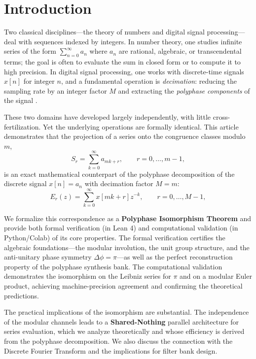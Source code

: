 \documentclass{article}
\theoremstyle{plain}
\theoremstyle{definition}
\theoremstyle{remark}
\begin{document}
\section{Introduction}
Two classical disciplines---the theory of numbers and digital signal processing---deal with sequences indexed by integers. In number theory, one studies infinite series of the form \(\sum_{n=0}^{\infty} a_n\) where \(a_n\) are rational, algebraic, or transcendental terms; the goal is often to evaluate the sum in closed form or to compute it to high precision. In digital signal processing, one works with discrete-time signals \(x[n]\) for integer \(n\), and a fundamental operation is \emph{decimation}: reducing the sampling rate by an integer factor \(M\) and extracting the \emph{polyphase components} of the signal \cite{vaidyanathan}.

These two domains have developed largely independently, with little cross-fertilization. Yet the underlying operations are formally identical. This article demonstrates that the projection of a series onto the congruence classes modulo \(m\),
\begin{equation}
S_r = \sum_{k=0}^{\infty} a_{mk + r}, \qquad r = 0, \dots, m-1,
\label{eq:modproj}
\end{equation}
is an exact mathematical counterpart of the polyphase decomposition of the discrete signal \(x[n] = a_n\) with decimation factor \(M = m\):
\begin{equation}
E_r(z) = \sum_{k=0}^{\infty} x[mk + r] z^{-k}, \qquad r = 0, \dots, M-1,
\label{eq:polyphase}
\end{equation}

We formalize this correspondence as a \textbf{Polyphase Isomorphism Theorem} and provide both formal verification (in Lean 4) and computational validation (in Python/Colab) of its core properties. The formal verification certifies the algebraic foundations---the modular involution, the unit group structure, and the anti-unitary phase symmetry \(\Delta\phi = \pi\)---as well as the perfect reconstruction property of the polyphase synthesis bank. The computational validation demonstrates the isomorphism on the Leibniz series for \(\pi\) and on a modular Euler product, achieving machine-precision agreement and confirming the theoretical predictions.

The practical implications of the isomorphism are substantial. The independence of the modular channels leads to a \textbf{Shared-Nothing} parallel architecture for series evaluation, which we analyze theoretically and whose efficiency is derived from the polyphase decomposition. We also discuss the connection with the Discrete Fourier Transform and the implications for filter bank design.
\end{document}
